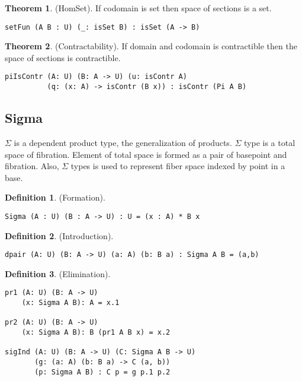 \documentclass{article}
\theoremstyle{definition}
\newtheorem{definition}{Definition}
\newtheorem{theorem}{Theorem}
\begin{document}
\begin{theorem} (HomSet).
If codomain is set then space of sections is a set.
\begin{lstlisting}
setFun (A B : U) (_: isSet B) : isSet (A -> B)
\end{lstlisting}
\end{theorem}

\begin{theorem} (Contractability).
If domain and codomain is contractible then the space of sections is contractible.
\begin{lstlisting}
piIsContr (A: U) (B: A -> U) (u: isContr A)
          (q: (x: A) -> isContr (B x)) : isContr (Pi A B)
\end{lstlisting}
\end{theorem}

\newpage
\subsection{Sigma}

$\Sigma$ is a dependent product type, the generalization of products.
$\Sigma$ type is a total space of fibration. Element of total
space is formed as a pair of basepoint and fibration. Also,
$\Sigma$ types is used to represent fiber space indexed by point in a base.

\begin{definition} (Formation).
\begin{lstlisting}
Sigma (A : U) (B : A -> U) : U = (x : A) * B x
\end{lstlisting}
\end{definition}

\begin{definition} (Introduction).
\begin{lstlisting}
dpair (A: U) (B: A -> U) (a: A) (b: B a) : Sigma A B = (a,b)
\end{lstlisting}
\end{definition}

\begin{definition} (Elimination).
\begin{lstlisting}
pr1 (A: U) (B: A -> U)
    (x: Sigma A B): A = x.1

pr2 (A: U) (B: A -> U)
    (x: Sigma A B): B (pr1 A B x) = x.2

sigInd (A: U) (B: A -> U) (C: Sigma A B -> U)
       (g: (a: A) (b: B a) -> C (a, b))
       (p: Sigma A B) : C p = g p.1 p.2
\end{lstlisting}
\end{definition}
\end{document}
